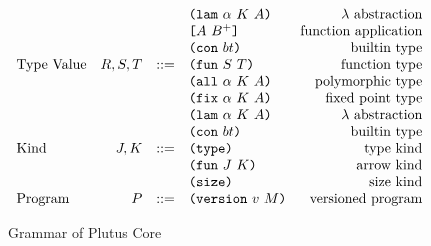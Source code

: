 \documentclass[../main.tex]{subfiles}
\begin{document}
\begin{figure*}[t]
\[\begin{array}{lrclr}
                                  &        &     & \texttt{(} \texttt{lam} ~ \alpha ~ K ~ A \texttt{)}        & \textrm{$\lambda$ abstraction}\\
                                  &        &     & \texttt{[} A ~ B^+ \texttt{]}              & \textrm{function application}\\
                                  &        &     & \texttt{(} \texttt{con} ~ bt \texttt{)}                  & \textrm{builtin type}\\
        \textrm{Type Value}       & R,S,T  & ::= & \texttt{(} \texttt{fun} ~ S ~ T \texttt{)}                & \textrm{function type}\\
                                  &        &     & \texttt{(} \texttt{all} ~ \alpha ~ K ~ A \texttt{)}        & \textrm{polymorphic type}\\
                                  &        &     & \texttt{(} \texttt{fix} ~ \alpha ~ K ~ A \texttt{)}        & \textrm{fixed point type}\\
                                  &        &     & \texttt{(} \texttt{lam} ~ \alpha ~ K ~ A \texttt{)}        & \textrm{$\lambda$ abstraction}\\
                                  &        &     & \texttt{(} \texttt{con} ~ bt \texttt{)}                  & \textrm{builtin type}\\
        \textrm{Kind}             & J,K    & ::= & \texttt{(} \texttt{type} \texttt{)}{}                   & \textrm{type kind}\\
                                  &        &     & \texttt{(} \texttt{fun} ~ J ~ K \texttt{)}                & \textrm{arrow kind}\\
                                  &        &     & \texttt{(} \texttt{size} \texttt{)}{}                   & \textrm{size kind}\\
        \textrm{Program}          & P      & ::= & \texttt{(} \texttt{version} ~ v ~ M \texttt{)}             & \textrm{versioned program}\\

    \end{array}\]
    \caption{Grammar of Plutus Core}
    \label{fig:Plutus_core_grammar}
\end{figure*}
\end{document}
